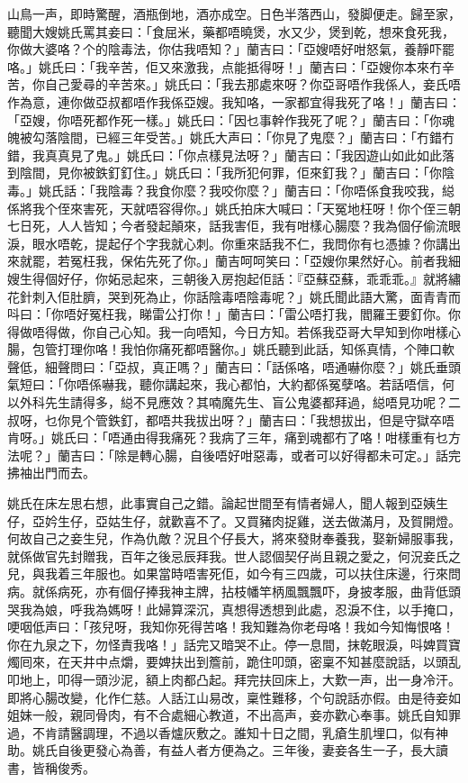 \documentclass[a5paper, 12pt, openany]{book} %
\begin{document}
	山鳥一声，即時驚醒，酒瓶倒地，酒亦成空。日色半落西山，發脚便走。歸至家，聽聞大嫂姚氏罵其妾曰：「食屈米，藥都唔曉煲，水又少，煲到乾，想來食死我，你做大婆咯？个的陰毒法，你估我唔知？」蘭吉曰：「亞嫂唔好咁怒氣，養靜吓罷咯。」姚氏曰：「我辛苦，佢又來激我，点能抵得呀！」蘭吉曰：「亞嫂你本來冇辛苦，你自己愛尋的辛苦來。」姚氏曰：「我去那處來呀？你亞哥唔作我係人，妾氏唔作為意，連你做亞叔都唔作我係亞嫂。我知咯，一家都宜得我死了咯！」蘭吉曰：「亞嫂，你唔死都作死一樣。」姚氏曰：「因乜事幹作我死了呢？」蘭吉曰：「你魂魄被勾落陰間，已經三年受苦。」姚氏大声曰：「你見了鬼麼？」蘭吉曰：「冇錯冇錯，我真真見了鬼。」姚氏曰：「你点樣見法呀？」蘭吉曰：「我因遊山如此如此落到陰間，見你被鉄釘釘住。」姚氏曰：「我所犯何罪，佢來釘我？」蘭吉曰：「你陰毒。」姚氏話：「我陰毒？我食你麼？我咬你麼？」蘭吉曰：「你唔係食我咬我，縂係將我个侄來害死，天就唔容得你。」姚氏拍床大喊曰：「天冤地枉呀！你个侄三朝七日死，人人皆知；今者發起顛來，話我害佢，我有咁樣心腸麼？我為個仔偷流眼淚，眼水唔乾，提起仔个字我就心刺。你重來話我不仁，我問你有乜憑據？你講出來就罷，若冤枉我，保佑先死了你。」蘭吉呵呵笑曰：「亞嫂你果然好心。前者我細嫂生得個好仔，你妬忌起來，三朝後入房抱起佢話：『亞蘇亞蘇，乖乖乖。』就將繡花針刺入佢肚臍，哭到死為止，你話陰毒唔陰毒呢？」姚氏聞此語大驚，面青青而呌曰：「你唔好冤枉我，睇雷公打你！」蘭吉曰：「雷公唔打我，閻羅王要釘你。你得做唔得做，你自己心知。我一向唔知，今日方知。若係我亞哥大早知到你咁樣心腸，包管打理你咯！我怕你痛死都唔醫你。」姚氏聽到此話，知係真情，个陣口軟聲低，細聲問曰：「亞叔，真正嗎？」蘭吉曰：「話係咯，唔通嚇你麼？」姚氏垂頭氣短曰：「你唔係嚇我，聽你講起來，我心都怕，大約都係冤孽咯。若話唔信，何以外科先生請得多，縂不見應效？其喃魔先生、盲公鬼婆都拜過，縂唔見功呢？二叔呀，乜你見个管鉄釘，都唔共我拔出呀？」蘭吉曰：「我想拔出，但是守獄卒唔肯呀。」姚氏曰：「唔通由得我痛死？我病了三年，痛到魂都冇了咯！咁樣重有乜方法呢？」蘭吉曰：「除是轉心腸，自後唔好咁惡毒，或者可以好得都未可定。」話完拂袖出門而去。

	姚氏在床左思右想，此事實自己之錯。論起世間至有情者婦人，聞人報到亞姨生仔，亞妗生仔，亞姑生仔，就歡喜不了。又買豬肉捉雞，送去做滿月，及賀開燈。何故自己之妾生兒，作為仇敵？況且个仔長大，將來發財奉養我，娶新婦服事我，就係做官先封贈我，百年之後忌辰拜我。世人認個契仔尚且親之愛之，何況妾氏之兒，與我着三年服也。如果當時唔害死佢，如今有三四歲，可以扶住床邊，行來問病。就係病死，亦有個仔捧我神主牌，拈枝幡竿柄風飄飄吓，身披孝服，曲背低頭哭我為娘，呼我為媽呀！此婦算深沉，真想得透想到此處，忍淚不住，以手掩口，哽咽低声曰：「孩兒呀，我知你死得苦咯！我知難為你老母咯！我如今知悔恨咯！你在九泉之下，勿怪責我咯！」話完又暗哭不止。停一息間，抹乾眼淚，呌婢買寶燭囘來，在天井中点爝，要婢扶出到簷前，跪住叩頭，密稟不知甚麼說話，以頭乱叩地上，叩得一頭沙泥，額上肉都凸起。拜完扶回床上，大歎一声，出一身冷汗。即將心腸改變，化作仁慈。人話江山易改，稟性難移，个句說話亦假。由是待妾如姐妹一般，親同骨肉，有不合處細心教道，不出高声，妾亦歡心奉事。姚氏自知罪過，不肯請醫調理，不過以香爐灰敷之。誰知十日之間，乳瘡生肌埋口，似有神助。姚氏自後更發心為善，有益人者方便為之。三年後，妻妾各生一子，長大讀書，皆稱俊秀。
\end{document}
